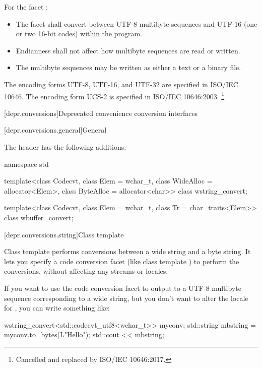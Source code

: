 \newpage

\pnum
For the facet :
\begin{itemize}
\item
  The facet shall convert between UTF-8 multibyte sequences
  and UTF-16 (one or two 16-bit codes) within the program.
\item
  Endianness shall not affect how multibyte sequences are read or written.
\item
  The multibyte sequences may be written as either a text or a binary file.
\end{itemize}

\pnum
The encoding forms UTF-8, UTF-16, and UTF-32 are specified in ISO/IEC 10646.
The encoding form UCS-2 is specified in ISO/IEC 10646:2003.%
\footnote{Cancelled and replaced by ISO/IEC 10646:2017.}

[depr.conversions]{Deprecated convenience conversion interfaces}

[depr.conversions.general]{General}

\pnum
The header  has the following additions:

\begin{codeblock}
namespace std {
  template<class Codecvt, class Elem = wchar_t,
           class WideAlloc = allocator<Elem>,
           class ByteAlloc = allocator<char>>
    class wstring_convert;

  template<class Codecvt, class Elem = wchar_t,
           class Tr = char_traits<Elem>>
    class wbuffer_convert;
}
\end{codeblock}

[depr.conversions.string]{Class template }

\pnum
Class template  performs conversions between a wide
string and a byte string. It lets you specify a code conversion facet
(like class template ) to perform the conversions, without
affecting any streams or locales.
\begin{example}
If you want to use the code
conversion facet  to output to  a UTF-8
multibyte sequence corresponding to a wide string, but you don't want to
alter the locale for , you can write something like:
\begin{codeblock}
wstring_convert<std::codecvt_utf8<wchar_t>> myconv;
std::string mbstring = myconv.to_bytes(L"Hello\n");
std::cout << mbstring;
\end{codeblock}
\end{example}

